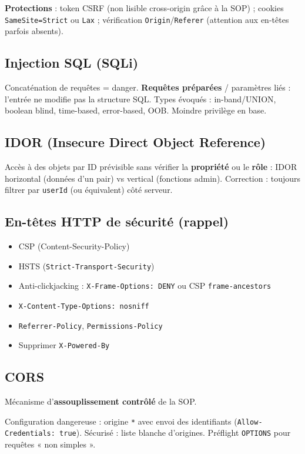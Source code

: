 \documentclass[11pt,a4paper]{article}
\begin{document}
\textbf{Protections} : token CSRF (non lisible cross-origin grâce à la SOP) ; cookies \texttt{SameSite=Strict} ou \texttt{Lax} ; vérification \texttt{Origin}/\texttt{Referer} (attention aux en-têtes parfois absents).

\subsection{Injection SQL (SQLi)}
Concaténation de requêtes = danger. \textbf{Requêtes préparées} / paramètres liés : l'entrée ne modifie pas la structure SQL. Types évoqués : in-band/UNION, boolean blind, time-based, error-based, OOB. Moindre privilège en base.

\subsection{IDOR (Insecure Direct Object Reference)}
Accès à des objets par ID prévisible sans vérifier la \textbf{propriété} ou le \textbf{rôle} : IDOR horizontal (données d'un pair) vs vertical (fonctions admin). Correction : toujours filtrer par \texttt{userId} (ou équivalent) côté serveur.

\subsection{En-têtes HTTP de sécurité (rappel)}
\begin{itemize}[nosep]
  \item CSP (Content-Security-Policy)
  \item HSTS (\texttt{Strict-Transport-Security})
  \item Anti-clickjacking : \texttt{X-Frame-Options: DENY} ou CSP \texttt{frame-ancestors}
  \item \texttt{X-Content-Type-Options: nosniff}
  \item \texttt{Referrer-Policy}, \texttt{Permissions-Policy}
  \item Supprimer \texttt{X-Powered-By}
\end{itemize}

\subsection{CORS}
Mécanisme d'\textbf{assouplissement contrôlé} de la SOP.

\noindent Configuration dangereuse : origine \texttt{*} avec envoi des identifiants (\texttt{Allow-Credentials: true}). Sécurisé : liste blanche d'origines. Préflight \texttt{OPTIONS} pour requêtes « non simples ».
\end{document}
